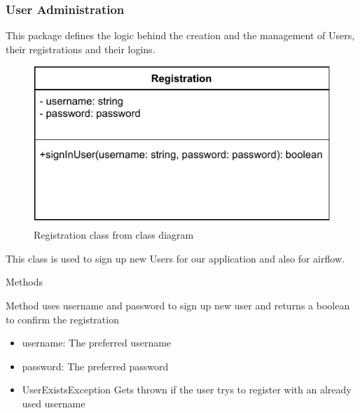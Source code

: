 \subsubsection{User Administration}
This package defines the logic behind the creation and the management of Users, their registrations and their logins.



\begin{figure}[h]
\centerline{\includegraphics[scale=1]{res/Klassen/RegistrationClass.pdf}}
\caption{Registration class from class diagram}
\end{figure}

This class is used to sign up new Users for our application and also for airflow.


\begin{methodenv}{Methods}


Method uses username and password to sign up new user and returns a boolean to confirm the registration

\begin{itemize}
	\item{username:}
	The preferred username
	\item{password:}
	The preferred password
\end{itemize}

\begin{itemize}
	\item{UserExistsException}
	Gets thrown if the user trys to register with an already used username
\end{itemize}
\end{methodenv}



